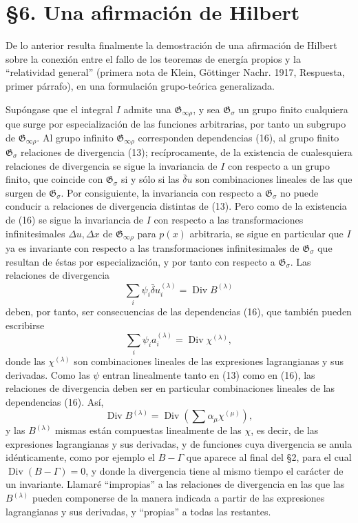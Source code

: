 \documentclass[11pt]{article}
\newcommand{\D}{\Delta}
\providecommand{\Div}{\operatorname{Div}}
\providecommand{\G}{\mathfrak G}
\providecommand{\bd}{\bar{\delta}}
\begin{document}
\section*{\S{}6. Una afirmación de Hilbert}

De lo anterior resulta finalmente la demostración de una afirmación de Hilbert sobre la conexión entre el fallo de los teoremas de energía propios y la ``relatividad general'' (primera nota de Klein, Göttinger Nachr. 1917, Respuesta, primer párrafo), en una formulación grupo-teórica generalizada.

Supóngase que el integral \(I\) admite una \(\G_{\infty\rho}\), y sea \(\G_\sigma\) un grupo finito cualquiera que surge por especialización de las funciones arbitrarias, por tanto un subgrupo de \(\G_{\infty\rho}\). Al grupo infinito \(\G_{\infty\rho}\) corresponden dependencias (16), al grupo finito \(\G_\sigma\) relaciones de divergencia (13); recíprocamente, de la existencia de cualesquiera relaciones de divergencia se sigue la invariancia de \(I\) con respecto a un grupo finito, que coincide con \(\G_\sigma\) si y sólo si las \(\bd u\) son combinaciones lineales de las que surgen de \(\G_\sigma\). Por consiguiente, la invariancia con respecto a \(\G_\sigma\) no puede conducir a relaciones de divergencia distintas de (13). Pero como de la existencia de (16) se sigue la invariancia de \(I\) con respecto a las transformaciones infinitesimales \(\D u,\D x\) de \(\G_{\infty\rho}\) para \(p(x)\) arbitraria, se sigue en particular que \(I\) ya es invariante con respecto a las transformaciones infinitesimales de \(\G_\sigma\) que resultan de éstas por especialización, y por tanto con respecto a \(\G_\sigma\). Las relaciones de divergencia
\[
\sum_i\psi_i\bd u_i^{(\lambda)}=\Div B^{(\lambda)}
\]
deben, por tanto, ser consecuencias de las dependencias (16), que también pueden escribirse
\[
\sum_i\psi_i a_i^{(\lambda)}=\Div\chi^{(\lambda)},
\]
donde las \(\chi^{(\lambda)}\) son combinaciones lineales de las expresiones lagrangianas y sus derivadas. Como las \(\psi\) entran linealmente tanto en (13) como en (16), las relaciones de divergencia deben ser en particular combinaciones lineales de las dependencias (16). Así,
\[
\Div B^{(\lambda)}=\Div\left(\sum \alpha_\mu\chi^{(\mu)}\right),
\]
y las \(B^{(\lambda)}\) mismas están compuestas linealmente de las \(\chi\), es decir, de las expresiones lagrangianas y sus derivadas, y de funciones cuya divergencia se anula idénticamente, como por ejemplo el \(B-\Gamma\) que aparece al final del \S{}2, para el cual \(\Div(B-\Gamma)=0\), y donde la divergencia tiene al mismo tiempo el carácter de un invariante. Llamaré ``impropias'' a las relaciones de divergencia en las que las \(B^{(\lambda)}\) pueden componerse de la manera indicada a partir de las expresiones lagrangianas y sus derivadas, y ``propias'' a todas las restantes.
\end{document}

